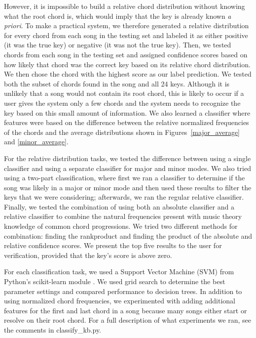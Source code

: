 \documentclass[letterpaper]{article}
\begin{document}
However, it is impossible to build a relative chord distribution without knowing what the root chord is, which would imply that the key is already known \textit{a priori}.  To make a practical system, we therefore generated a relative distribution for every chord from each song in the testing set and labeled it as either positive (it was the true key) or negative (it was not the true key).  Then, we tested chords from each song in the testing set and assigned confidence scores based on how likely that chord was the correct key based on its relative chord distribution.  We then chose the chord with the highest score as our label prediction.  We tested both the subset of chords found in the song and all 24 keys.  Although it is unlikely that a song would not contain its root chord, this is likely to occur if a user gives the system only a few chords and the system needs to recognize the key based on this small amount of information.  We also learned a classifier where features were based on the difference between the relative normalized  frequencies of the chords and the average distributions shown in Figures~\ref{major_average} and \ref{minor_average}.

For the relative distribution tasks, we tested the difference between using a single classifier and using a separate classifier for major and minor modes.  We also tried using a two-part classification, where first we ran a classifier to determine if the song was likely in a major or minor mode and then used these results to filter the keys that we were considering; afterwards, we ran the regular relative classifier.  Finally, we tested the combination of using both an absolute classifier and a relative classifier to combine the natural frequencies present with music theory knowledge of common chord progressions.  We tried two different methods for combination: finding the rankproduct and finding the product of the absolute and relative confidence scores.  We present the top five results to the user for verification, provided that the key's score is above zero.

For each classification task, we used a Support Vector Machine (SVM) from Python's scikit-learn module \cite{scikit-learn}.  We used grid search to determine the best parameter settings and compared performance to decision trees.  In addition to using normalized chord frequencies, we experimented with adding additional features for the first and last chord in a song because many songs either start or resolve on their root chord.  For a full description of what experiments we ran, see the comments in classify\_kb.py.
\end{document}
